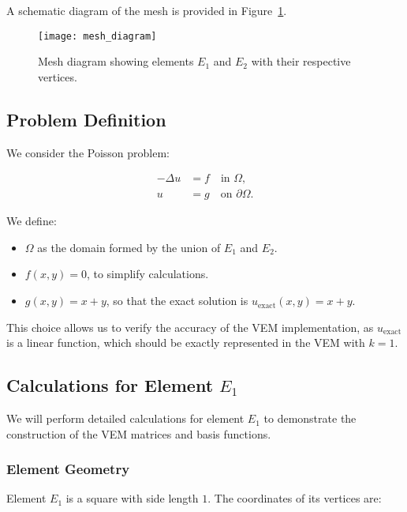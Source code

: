 \documentclass[class=article, crop=false]{standalone}
\begin{document}
A schematic diagram of the mesh is provided in Figure~\ref{fig:mesh_diagram}.

\begin{figure}[h]
    \centering
    \texttt{[image: mesh\_diagram]}
    \caption{Mesh diagram showing elements \( E_1 \) and \( E_2 \) with their respective vertices.}
    \label{fig:mesh_diagram}
\end{figure}

\subsection{Problem Definition}

We consider the Poisson problem:

\begin{align}
    -\Delta u &= f \quad \text{in } \Omega, \label{eq:poisson_example}\\
    u &= g \quad \text{on } \partial \Omega. \label{eq:dirichlet_example}
\end{align}

We define:

\begin{itemize}
    \item \( \Omega \) as the domain formed by the union of \( E_1 \) and \( E_2 \).
    \item \( f(x, y) = 0 \), to simplify calculations.
    \item \( g(x, y) = x + y \), so that the exact solution is \( u_{\text{exact}}(x, y) = x + y \).
\end{itemize}

This choice allows us to verify the accuracy of the VEM implementation, as \( u_{\text{exact}} \) is a linear function, which should be exactly represented in the VEM with \( k = 1 \).

\subsection{Calculations for Element \( E_1 \)}

We will perform detailed calculations for element \( E_1 \) to demonstrate the construction of the VEM matrices and basis functions.

\subsubsection{Element Geometry}

Element \( E_1 \) is a square with side length \( 1 \). The coordinates of its vertices are:
\end{document}
